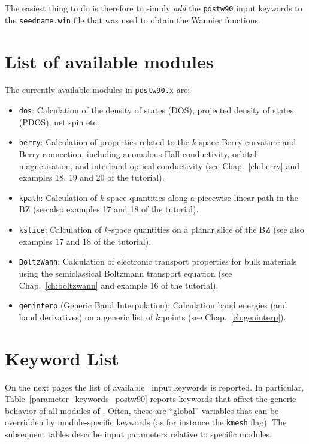 The easiest thing to do
is therefore to simply \emph{add} the \texttt{postw90} input keywords to
the \texttt{seedname.win} file that was used
to obtain the Wannier functions.

\section{List of available modules}

The currently available modules in \texttt{postw90.x} are:
\begin{itemize}
\item \texttt{dos}: Calculation of the density of states (DOS), projected
  density of states (PDOS), net spin etc.
\item \texttt{berry}: Calculation of properties related to the
  $k$-space Berry curvature and Berry connection, including anomalous
  Hall conductivity, orbital magnetisation, and interband optical
  conductivity (see Chap.~\ref{ch:berry} and examples 18, 19 and 20 of
  the tutorial).
\item \texttt{kpath}: Calculation of $k$-space quantities along a
  piecewise linear path in the BZ (see also examples 17 and 18 of the tutorial).
\item \texttt{kslice}: Calculation of $k$-space quantities on a planar
  slice of the BZ (see also examples 17 and 18 of the tutorial).
\item \texttt{BoltzWann}: Calculation of electronic transport
  properties for bulk materials using the semiclassical Boltzmann
  transport equation (see Chap.~\ref{ch:boltzwann} and example 16 of
  the tutorial).
\item \texttt{geninterp} (Generic Band Interpolation): Calculation band energies (and band
  derivatives) on a generic list of $k$ points (see Chap.~\ref{ch:geninterp}).
\end{itemize}


\section{Keyword List}
On the next pages the list of available
\postw\ input keywords is reported.
In particular, Table~\ref{parameter_keywords_postw90} reports keywords
that affect the generic behavior of all modules of
\postw. Often, these are ``global'' variables that can be overridden
by module-specific keywords (as for instance the {\tt kmesh}
flag). The subsequent tables describe input parameters relative to
specific modules. 

